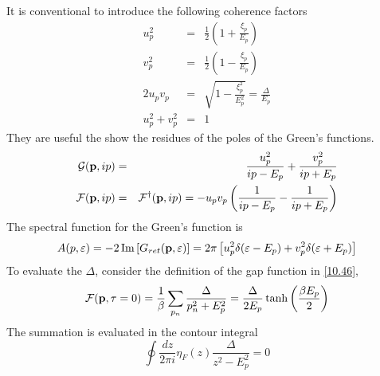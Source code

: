 It is conventional to introduce the following coherence factors
\begin{eqnarray}
    u_p^2 &=& \frac{1}{2} \left( 1 + \frac{\xi_p}{E_p} \right)  \nonumber \\
    v_p^2 &=& \frac{1}{2} \left( 1 - \frac{\xi_p}{E_p} \right) \nonumber \\
    2 u_p v_p &=& \sqrt{ 1 - \frac{\xi_p^2}{E_p^2} } = \frac{\Delta}{E_p} \label{10.63} \\
    u_p^2 + v_p^2 &=& 1 \nonumber
\end{eqnarray}
They are useful the show the residues of the poles of the Green's functions.
\begin{eqnarray}
    \mathcal{G}(\mathbf{p},ip) &=& \frac{u_p^2}{ip-E_p}  + \frac{v_p^2}{ip + E_p}  \label{10.64} \\ 
    \mathcal{F}(\mathbf{p},ip) &=& \mathcal{F}^\dagger(\mathbf{p},ip) = - u_p v_p \left( \frac{1}{ip-E_p} - \frac{1}{ip+E_p} \right)  \label{10.65}
\end{eqnarray}
The spectral function for the Green's function is
\begin{equation}
    A(p,\varepsilon) = -2 \Im \left[ G_{ret}(\mathbf{p},\varepsilon) \right] = 2\pi \left[ u^2_p \delta(\varepsilon - E_p ) + v^2_p \delta(\varepsilon + E_p ) \right] \label{10.66}
\end{equation}
To evaluate the $\Delta$, consider the definition of the gap function in \eqref{10.46},
\begin{equation}
    \mathcal{F}(\mathbf{p},\tau=0) = \frac{1}{\beta} \sum_{p_n} \frac{\Delta}{p_n^2 + E_p^2 } = \frac{\Delta }{2E_p} \tanh \left( \frac{\beta E_p}{2} \right)  \label{10.67}
\end{equation}
The summation is evaluated in the contour integral
\begin{equation}
    \oint \frac{dz}{2\pi i}  \eta_F(z) \frac{\Delta}{z^2 - E_p^2} =0\label{10.68}
\end{equation}
